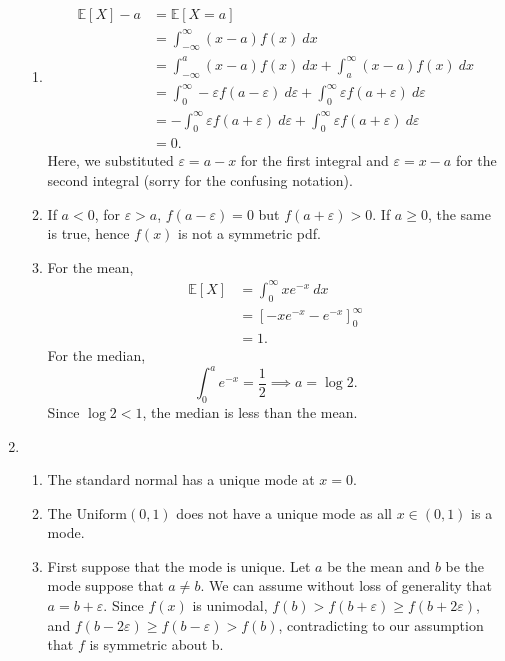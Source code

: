 \documentclass{article}
\begin{document}
\begin{enumerate}
\begin{enumerate}
        \item \begin{align*}
            \mathbb{E}[X] - a
            &= \mathbb{E}[X = a] \\
            &= \int_{-\infty}^{\infty} (x - a)f(x) \ dx \\
            &= \int_{-\infty}^{a} (x - a)f(x) \ dx + \int_{a}^{\infty} (x - a)f(x) \ dx \\
            &= \int_{0}^{\infty} -\varepsilon f(a - \varepsilon) \ d\varepsilon 
            + \int_{0}^{\infty} \varepsilon f(a + \varepsilon) \ d\varepsilon \\
            &= -\int_{0}^{\infty} \varepsilon f(a + \varepsilon) \ d\varepsilon 
            + \int_{0}^{\infty} \varepsilon f(a + \varepsilon) \ d\varepsilon \\
            &= 0.
        \end{align*}
        Here, we substituted $\varepsilon = a - x$ for the first integral and $\varepsilon = x - a$ for the 
        second integral (sorry for the confusing notation).

        \item If $a < 0$, for $\varepsilon > a$, $f(a - \varepsilon) = 0$ but $f(a + \varepsilon) > 0$. 
        If $a \geq 0$, the same is true, hence $f(x)$ is not a symmetric pdf.

        \item For the mean, 
        \begin{align*}
            \mathbb{E}[X]
            &= \int_{0}^{\infty} xe^{-x} \ dx \\
            &= [-xe^{-x} - e^{-x}]_{0}^{\infty} \\
            &= 1.
        \end{align*}
        For the median, 
        \[ \int_{0}^{a} e^{-x} = \frac{1}{2} \implies a = \log{2}. \]
        Since $\log{2} < 1$, the median is less than the mean.
    \end{enumerate}

    \item \begin{enumerate}
        \item The standard normal has a unique mode at $x = 0$.
        
        \item The $\text{Uniform}(0, 1)$ does not have a unique mode as all $x \in (0, 1)$ is a mode.
        
        \item First suppose that the mode is unique. Let $a$ be the mean and $b$ be the mode suppose that 
        $a \neq b$. We can assume without loss of generality that $a = b + \varepsilon$. Since $f(x)$ is 
        unimodal, $f(b) > f(b + \varepsilon) \geq f(b + 2\varepsilon)$, and 
        $f(b - 2\varepsilon) \geq f(b - \varepsilon) > f(b)$, contradicting to our assumption that $f$ is 
        symmetric about b.


\end{enumerate}
\end{enumerate}
\end{document}

